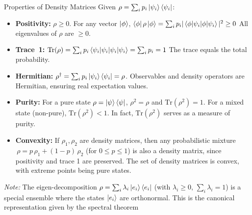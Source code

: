 \begin{frame}{Properties of Density Matrices}
  Given $\rho = \sum_i p_i \ket{\psi_i}\bra{\psi_i}$:
  \begin{itemize}
    \item \textbf{Positivity:} $\rho \ge 0$. For any vector $\ket{\phi}$, $\bra{\phi}\rho\ket{\phi} = \sum_i p_i |\braket{\phi|\psi_i}|^2 \ge 0$ %
    All eigenvalues of $\rho$ are $\ge 0$.
    \item \textbf{Trace~1:} $\mathrm{Tr}(\rho) = \sum_i p_i \braket{\psi_i|\psi_i} = \sum_i p_i = 1$ %
    The trace equals the total probability.
    \item \textbf{Hermitian:} $\rho^\dagger = \sum_i p_i \ket{\psi_i}\bra{\psi_i} = \rho$. Observables and density operators are Hermitian, ensuring real expectation values.
    \item \textbf{Purity:} For a pure state $\rho = \ket{\psi}\bra{\psi}$, $\rho^2 = \rho$ and $\mathrm{Tr}(\rho^2) = 1$. For a mixed state (non-pure), $\mathrm{Tr}(\rho^2) < 1$. In fact, $\mathrm{Tr}(\rho^2)$ serves as a measure of purity.
    \item \textbf{Convexity:} If $\rho_1, \rho_2$ are density matrices, then any probabilistic mixture $\,\rho = p\,\rho_1 + (1-p)\,\rho_2$ (for $0\le p \le 1$) is also a density matrix, since positivity and trace 1 are preserved. The set of density matrices is convex, with extreme points being pure states.
  \end{itemize}
  \vspace{1ex}
  \textit{Note:} The eigen-decomposition $\rho = \sum_i \lambda_i \ket{e_i}\bra{e_i}$ (with $\lambda_i \ge 0$, $\sum_i\lambda_i=1$) is a special ensemble where the states $\ket{e_i}$ are orthonormal. This is the canonical representation given by the spectral theorem
\end{frame}

